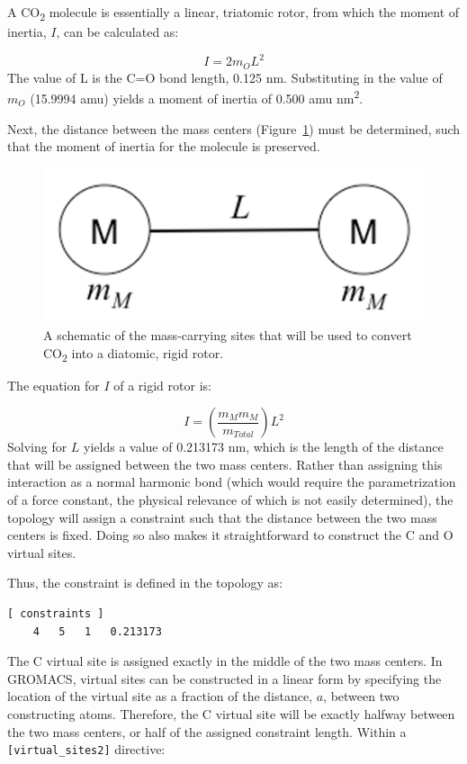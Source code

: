 \documentclass[9pt,tutorial,pubversion]{livecoms}
\begin{document}
A CO\textsubscript{2} molecule is essentially a linear, triatomic rotor, from which the moment of inertia, $I$, can be calculated as:

\begin{equation} \label{eq_rotor}
I = 2 m_O L^2
\end{equation}
%
The value of L is the C=O bond length, 0.125 nm. Substituting in the value of $m_O$ (15.9994 amu) yields a moment of inertia of 0.500 amu nm\textsuperscript{2}.

Next, the distance between the mass centers (Figure~\ref{vsites_masses_fig}) must be determined, such that the moment of inertia for the molecule is preserved.

\begin{figure}[H]
\centering
\includegraphics{vsites_masses}
\caption{A schematic of the mass-carrying sites that will be used to convert CO\textsubscript{2} into a diatomic, rigid rotor.}
\label{vsites_masses_fig}
\end{figure}

The equation for $I$ of a rigid rotor is:

\begin{equation} \label{eq_diatomic}
I = \left(\frac{m_M m_M}{m_{Total}}\right) L^2
\end{equation}
%
Solving for $L$ yields a value of 0.213173 nm, which is the length of the distance that will be assigned between the two mass centers. Rather than assigning this interaction as a normal harmonic bond (which would require the parametrization of a force constant, the physical relevance of which is not easily determined), the topology will assign a constraint such that the distance between the two mass centers is fixed. Doing so also makes it straightforward to construct the C and O virtual sites.

Thus, the constraint is defined in the topology as:

\begin{lstlisting}
[ constraints ]
    4   5   1   0.213173
\end{lstlisting}
%
The C virtual site is assigned exactly in the middle of the two mass centers. In GROMACS, virtual sites can be constructed in a linear form by specifying the location of the virtual site as a fraction of the distance, $a$, between two constructing atoms. Therefore, the C virtual site will be exactly halfway between the two mass centers, or half of the assigned constraint length. Within a \texttt{[virtual\_sites2]} directive: 
\end{document}
